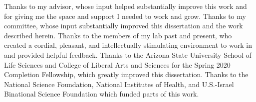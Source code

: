 Thanks to my advisor, whose input helped substantially improve this work and for giving me the space and support I needed to work and grow.
Thanks to my committee, whose input substantially improved this dissertation and the work described herein.
Thanks to the members of my lab past and present, who created a cordial, pleasant, and intellectually stimulating environment to work in and provided helpful feedback.
Thanks to the Arizona State University School of Life Sciences and College of Liberal Arts and Sciences for the Spring 2020 Completion Fellowship, which greatly improved this dissertation.
Thanks to the National Science Foundation, National Institutes of Health, and U.S.-Israel Binational Science Foundation  which funded parts of this work.
